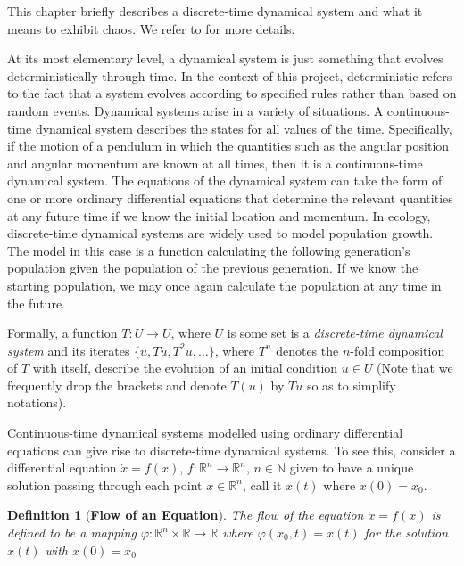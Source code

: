 \documentclass[a4paper,12pt,twoside]{report}
\newtheorem{Definition}{Definition}[]
\begin{document}
This chapter briefly describes a discrete-time dynamical system and what it means to exhibit chaos. We refer to \cite{devaney2018introduction, de2013elements} for more details. 

At its most elementary level, a dynamical system is just something that evolves deterministically through time. In the context of this project, deterministic refers to the fact that a system evolves according to specified rules rather than based on random events. 
Dynamical systems arise in a variety of situations. A continuous-time dynamical system describes the states for all values of the time. Specifically, if the motion of a pendulum in which the quantities such as the angular position and angular momentum are known at all times, then it is a continuous-time dynamical system. The equations of the dynamical system can take the form of one or more ordinary differential equations that determine the relevant quantities at any future time if we know the initial location and momentum. 
In ecology, discrete-time dynamical systems are widely used to model population growth. The model in this case is a function calculating the following generation's population given the population of the previous generation. If we know the starting population, we may once again calculate the population at any time in the future. 

Formally, a function $T: U \to U$, where $U$ is some set is  a \emph{discrete-time dynamical system} and its iterates $\{u,Tu,T^2u,\ldots\}$, where $T^n$ denotes the $n$-fold composition of $T$ with itself, describe the evolution of an initial condition $u\in U$ (Note that we frequently drop the brackets and denote $T(u)$ by $Tu$ so as to simplify notations).  





Continuous-time dynamical systems modelled using ordinary differential equations can give rise to discrete-time dynamical systems. To see this, consider a differential equation $\dot{x} = f(x)$, $f: \mathbb{R}^n \to \mathbb{R}^n$, $n\in\mathbb{N}$ given to have a unique solution passing through 
each point $x\in\mathbb{R}^{n}$, call it $x(t)$ where $x(0)=x_0$. 

\begin{Definition}
  [\bf Flow of an Equation] \label{Dfn_Flow}\rm
  The flow of the equation  $\dot{x} = f(x)$  is defined to be a mapping $\varphi: \mathbb{R}^n \times \mathbb{R} \to \mathbb{R}$ where $\varphi(x_0,t)= x(t)$ for the solution $x(t)$ with $x(0)=x_0$ 
\end{Definition}
\end{document}
